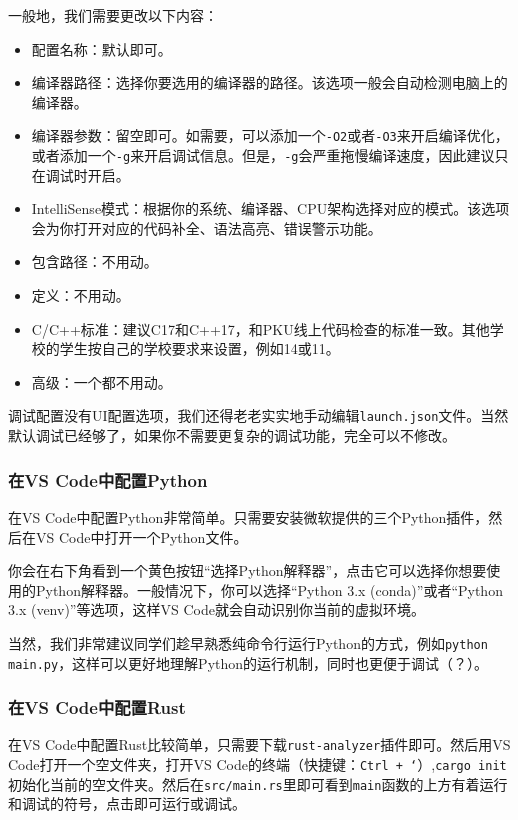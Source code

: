 \documentclass[../main.tex]{subfiles}
\begin{document}
一般地，我们需要更改以下内容：
\begin{itemize}
  \item 配置名称：默认即可。
  \item 编译器路径：选择你要选用的编译器的路径。该选项一般会自动检测电脑上的编译器。
  \item 编译器参数：留空即可。如需要，可以添加一个\texttt{-O2}或者\texttt{-O3}来开启编译优化，或者添加一个\texttt{-g}来开启调试信息。但是，\texttt{-g}会严重拖慢编译速度，因此建议只在调试时开启。
  \item IntelliSense模式：根据你的系统、编译器、CPU架构选择对应的模式。该选项会为你打开对应的代码补全、语法高亮、错误警示功能。
  \item 包含路径：不用动。
  \item 定义：不用动。
  \item C/C++标准：建议C17和C++17，和PKU线上代码检查的标准一致。其他学校的学生按自己的学校要求来设置，例如14或11。
  \item 高级：一个都不用动。
\end{itemize}

调试配置没有UI配置选项，我们还得老老实实地手动编辑\texttt{launch.json}文件。当然默认调试已经够了，如果你不需要更复杂的调试功能，完全可以不修改。


\subsubsection{在VS Code中配置Python}

在VS Code中配置Python非常简单。只需要安装微软提供的三个Python插件，然后在VS Code中打开一个Python文件。

你会在右下角看到一个黄色按钮“选择Python解释器”，点击它可以选择你想要使用的Python解释器。一般情况下，你可以选择“Python 3.x (conda)”或者“Python 3.x (venv)”等选项，这样VS Code就会自动识别你当前的虚拟环境。

当然，我们非常建议同学们趁早熟悉纯命令行运行Python的方式，例如\texttt{python main.py}，这样可以更好地理解Python的运行机制，同时也更便于调试（？）。

\subsubsection{在VS Code中配置Rust}

在VS Code中配置Rust比较简单，只需要下载\texttt{rust-analyzer}插件即可。然后用VS Code打开一个空文件夹，打开VS Code的终端（快捷键：\texttt{Ctrl + `}）,\texttt{cargo init} 初始化当前的空文件夹。然后在\texttt{src/main.rs}里即可看到\texttt{main}函数的上方有着运行和调试的符号，点击即可运行或调试。
\end{document}
